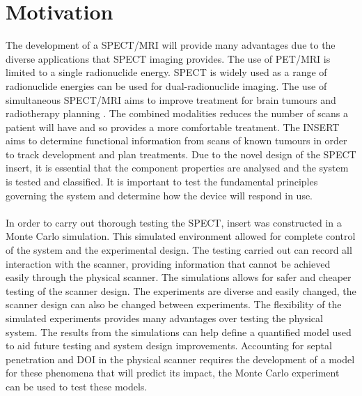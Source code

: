 \section{Motivation}
The development of a SPECT/MRI will provide many advantages due to the diverse applications that SPECT imaging provides. The use of PET/MRI is limited to a single radionuclide energy. SPECT is widely used as a range of radionuclide energies can be used for dual-radionuclide imaging. The use of simultaneous SPECT/MRI aims to improve treatment for brain tumours and radiotherapy planning \cite{doi:10.1259/bjr.20160690}. The combined modalities reduces the number of scans a patient will have and so provides a more comfortable treatment. The INSERT aims to determine functional information from scans of known tumours in order to track development and plan treatments. Due to the novel design of the SPECT insert, it is essential that the component properties are analysed and the system is tested and classified. It is important to test the fundamental principles governing the system and determine how the device will respond in use.
\paragraph{}
In order to carry out thorough testing the SPECT, insert was constructed in a Monte Carlo simulation. This simulated environment allowed for complete control of the system and the experimental design. The testing carried out can record all interaction with the scanner, providing information that cannot be achieved easily through the physical scanner. The simulations allows for safer and cheaper testing of the scanner design. The experiments are diverse and easily changed, the scanner design can also be changed between experiments. The flexibility of the simulated experiments provides many advantages over testing the physical system. The results from the simulations can help define a quantified model used to aid future testing and system design improvements. Accounting for septal penetration and DOI in the physical scanner requires the development of a model for these phenomena that will predict its impact, the Monte Carlo experiment can be used to test these models. 
